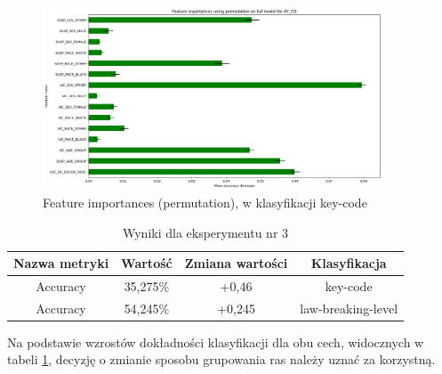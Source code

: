 \documentclass{classrep}
\begin{document}
{{{{                    \begin{figure}[!htbp]
                        \centering
                        \includegraphics[width=0.9\textwidth]{img/5.1.3/3/Feature importances using permutation on full model for KY_CD.png}
                        \caption{Feature importances (permutation), w klasyfikacji key-code}
                        \label{goal_1_exp_3_imp_perm_key}
                    \end{figure}
                    
                    \begin{table}
                    \centering
                     \begin{tabular}{|c|c|c|c|}
                            \hline
                          Nazwa metryki & Wartość & Zmiana wartości & Klasyfikacja \\ \hline
                            Accuracy &  35,275\% & +0,46 & key-code\\ \hline
                            Accuracy &  54,245\% & +0,245 & law-breaking-level\\ \hline
                        \end{tabular}
                        \caption{Wyniki dla eksperymentu nr 3}
                        \label{goal_1_exp_3_results}
                     \end{table}
                     \FloatBarrier
                     Na podstawie wzrostów dokładności klasyfikacji dla obu cech, widocznych w tabeli \ref{goal_1_exp_3_results}, decyzję o zmianie sposobu grupowania ras należy uznać za korzystną.
                }
}}}
\end{document}
